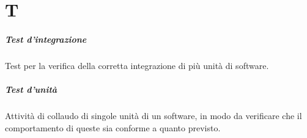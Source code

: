 \chapter{T}

\paragraph*{Test d'integrazione}
Test per la verifica della corretta integrazione di più unità di software.

\paragraph*{Test d'unità}
Attività di collaudo di singole unità di un software, in modo da verificare che il comportamento di queste sia conforme a quanto previsto.
